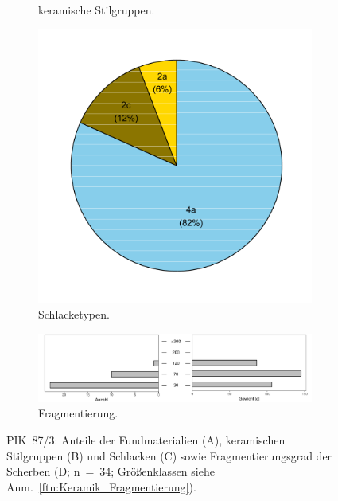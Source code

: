 \begin{figure}[!tb]
\begin{subfigure}[t]{0.32\textwidth}
		\caption{keramische Stilgruppen.}
		\label{fig:PIK87-3_Stilgruppen}
	\end{subfigure}
	\begin{subfigure}[t]{0.32\textwidth}
		\centering
		\includegraphics[width = \textwidth]{fig/9-10_PIK87-3_Schlacketypen_R_modDS.pdf}
		\caption{Schlacketypen.\vspace{1em}}
		\label{fig:PIK87-3_SchlackeTyp}
	\end{subfigure}
	\begin{subfigure}[t]{\textwidth}
		\centering
		\includegraphics[width = \textwidth]{fig/9-10_PIK87-3_Fragmentierung.pdf}
		\caption{Fragmentierung.}
		\label{fig:PIK87-3_Fragmentierung}
	\end{subfigure}
	\caption{PIK~87/3: Anteile der Fundmaterialien (A), keramischen Stilgruppen (B) und Schlacken (C) sowie Fragmentierungsgrad der Scherben (D; n~=~34; Größenklassen siehe Anm.~\ref{ftn:Keramik_Fragmentierung}).}
	\label{fig:PIK87-3_Funde}
\end{figure}

